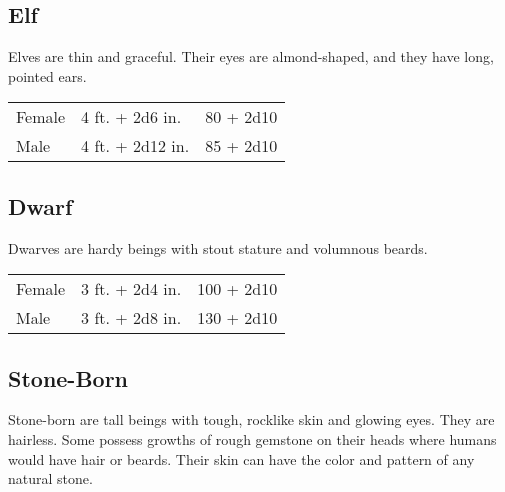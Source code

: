 \begin{multicols}{2}
\subsection{Elf}

Elves are thin and graceful. Their eyes are almond-shaped, and they
have long, pointed ears.

\begin{center}
{
\begin{xtabular}{|l|l|l|}
Female & 4 ft. + 2d6 in. & 80 + 2d10 \\
Male & 4 ft. + 2d12 in. & 85 + 2d10 \\
\hline
\end{xtabular}
}
\end{center}

\subsection{Dwarf}

Dwarves are hardy beings with stout stature and volumnous beards.

\begin{center}
{
\begin{xtabular}{|l|l|l|}
Female & 3 ft. + 2d4 in. & 100 + 2d10 \\
Male & 3 ft. + 2d8 in. & 130 + 2d10 \\
\hline
\end{xtabular}
}
\end{center}

\subsection{Stone-Born}

Stone-born are tall beings with tough, rocklike skin and glowing eyes. They are hairless. Some
possess growths of rough gemstone on their heads where humans would have hair or beards. Their
skin can have the color and pattern of any natural stone.


\end{multicols}
